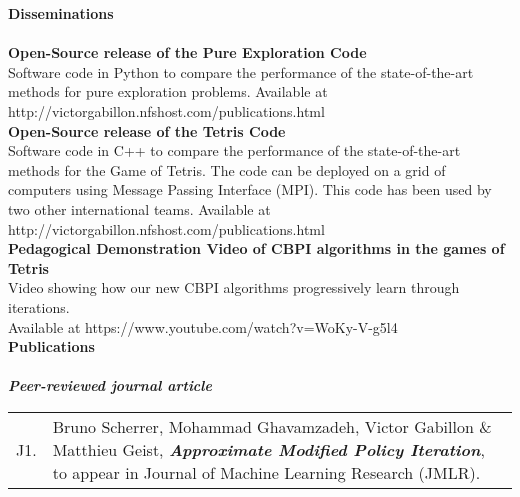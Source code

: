 \newpage
\noindent\textbf{Disseminations}\\[-.4cm]\noindent\makebox[\linewidth]{\rule{\columnwidth}{0.4pt}}\\[.1cm]
\noindent\textbf{Open-Source release of the Pure Exploration Code}  \\
Software code in Python to compare the performance of the state-of-the-art methods for pure exploration problems. Available at http://victorgabillon.nfshost.com/publications.html\\
\noindent\textbf{Open-Source release of the Tetris Code }  \\
Software code in C++ to compare the performance of the state-of-the-art methods for the Game of Tetris.  The code can be deployed on a grid of computers using Message Passing Interface (MPI). This code has been used by two other international teams. Available at http://victorgabillon.nfshost.com/publications.html\\
\noindent\textbf{Pedagogical Demonstration Video of CBPI algorithms in the games of Tetris }   \\
Video showing how our new CBPI algorithms progressively learn through iterations.\\ Available at https://www.youtube.com/watch?v=WoKy-V-g5l4\\[.2cm]


\noindent\textbf{Publications}\\[-.4cm]\noindent\makebox[\linewidth]{\rule{\columnwidth}{0.4pt}}\\[.1cm]
\textit{\textbf{Peer-reviewed journal article}}\\
\noindent\begin{tabularx}{\columnwidth}{@{} l X @{}}
 J1. & Bruno Scherrer, Mohammad Ghavamzadeh, Victor Gabillon $\&$ Matthieu Geist, \textbf{\emph{Approximate Modified Policy Iteration}}, to appear in Journal of Machine Learning Research (JMLR).
  \end{tabularx}\\
  

